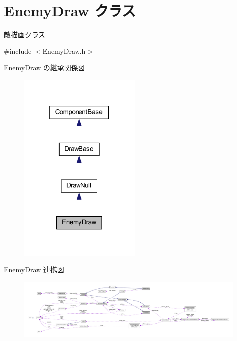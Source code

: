 \hypertarget{class_enemy_draw}{}\section{Enemy\+Draw クラス}
\label{class_enemy_draw}


敵描画クラス  




{\ttfamily \#include $<$Enemy\+Draw.\+h$>$}



Enemy\+Draw の継承関係図\nopagebreak
\begin{figure}[H]
\begin{center}
\leavevmode
\includegraphics[width=169pt]{class_enemy_draw__inherit__graph}
\end{center}
\end{figure}


Enemy\+Draw 連携図\nopagebreak
\begin{figure}[H]
\begin{center}
\leavevmode
\includegraphics[width=350pt]{class_enemy_draw__coll__graph}
\end{center}
\end{figure}
